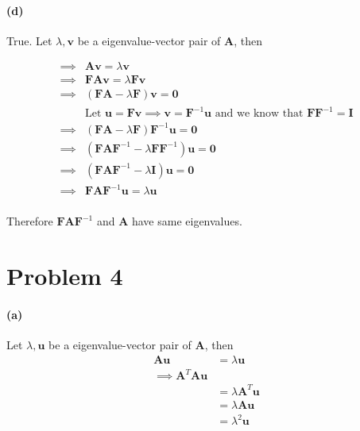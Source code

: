 \documentclass[12pt, letterpaper]{article}
\begin{document}
\paragraph{(d)} True. Let $\lambda, \mathbf{v}$ be a eigenvalue-vector pair of $\mathbf{A}$, then

\begin{align*}
  \implies &\mathbf{A}\mathbf{v} = \lambda \mathbf{v} \\
  \implies &\mathbf{F}\mathbf{A}\mathbf{v} = \lambda \mathbf{F}\mathbf{v} \\
  \implies &(\mathbf{F}\mathbf{A} - \lambda \mathbf{F})\mathbf{v} = \mathbf{0} \\
           &\text{Let $\mathbf{u} = \mathbf{Fv}
             \implies \mathbf{v} = \mathbf{F}^{-1}\mathbf{u}$ and
             we know that $\mathbf{F}\mathbf{F}^{-1} = \mathbf{I}$} \\
  \implies &(\mathbf{F}\mathbf{A} - \lambda \mathbf{F})\mathbf{F}^{-1}\mathbf{u} = \mathbf{0} \\
  \implies &(\mathbf{F}\mathbf{A}\mathbf{F}^{-1} - \lambda \mathbf{F}\mathbf{F}^{-1})\mathbf{u} = \mathbf{0} \\
  \implies &(\mathbf{F}\mathbf{A}\mathbf{F}^{-1} - \lambda \mathbf{I})\mathbf{u} = \mathbf{0} \\
  \implies &\mathbf{F}\mathbf{A}\mathbf{F}^{-1}\mathbf{u} = \lambda \mathbf{u} \\
\end{align*}

Therefore $\mathbf{FAF}^{-1}$ and $\mathbf{A}$ have same eigenvalues.

\pagebreak
\section*{Problem 4}

\paragraph{(a)} Let $\lambda, \mathbf{u}$ be a eigenvalue-vector pair of $\mathbf{A}$, then
\begin{align*}
  \mathbf{A}\mathbf{u} &= \lambda \mathbf{u} \\
  \implies \mathbf{A}^T\mathbf{A}\mathbf{u} \\
             &= \lambda \mathbf{A}^T\mathbf{u} \\
             &= \lambda \mathbf{A}\mathbf{u} \\
             &= \lambda^2 \mathbf{u} \\
\end{align*}
\end{document}
